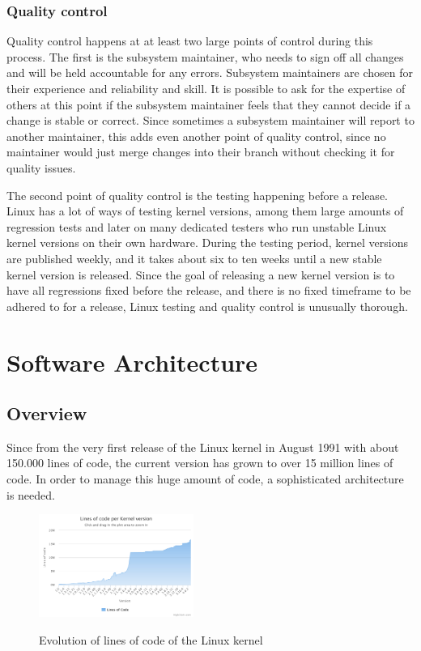 \documentclass{sig-alternate-05-2015}
\begin{document}
\subsubsection{Quality control}

Quality control happens at at least two large points of control during this process.
The first is the subsystem maintainer, who needs to sign off all changes and will be held accountable for any errors.
Subsystem maintainers are chosen for their experience and reliability and skill.
It is possible to ask for the expertise of others at this point if the subsystem maintainer feels that they cannot decide if a change is stable or correct.
Since sometimes a subsystem maintainer will report to another maintainer, this adds even another point of quality control, since no maintainer would just merge changes into their branch without checking it for quality issues.

The second point of quality control is the testing happening before a release.
Linux has a lot of ways of testing kernel versions, among them large amounts of regression tests and later on many dedicated testers who run unstable Linux kernel versions on their own hardware.
During the testing period, kernel versions are published weekly, and it takes about six to ten weeks until a new stable kernel version is released.
Since the goal of releasing a new kernel version is to have all regressions fixed before the release, and there is no fixed timeframe to be adhered to for a release, Linux testing and quality control is unusually thorough.


\section{Software Architecture}
\subsection{Overview}
Since from the very first release of the Linux kernel in August 1991 \cite{linuxtimeline} with about 150.000 lines of code, the current version has grown to over 15 million lines of code. In order to manage this huge amount of code, a sophisticated architecture is needed.
\begin{figure}[h]
\centering
\includegraphics[width= 0.45\textwidth ]{img/chart.pdf}
\label{kconfig-compil}
\caption{Evolution of lines of code of the Linux kernel \cite{linuxcounter}}
\end{figure}
\end{document}

